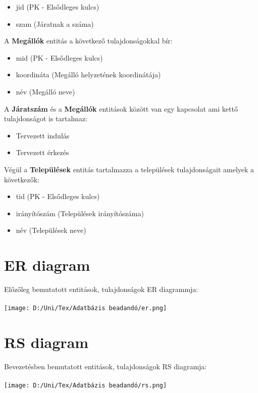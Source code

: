 \documentclass[12pt]{article}
\begin{document}
\begin{itemize}
\item jid (PK - Elsődleges kulcs)
\item szam (Járatnak a száma)
\end{itemize}
A \textbf{Megállók} entitás a következő tulajdonságokkal bír:
\begin{itemize}
\item mid (PK - Elsődleges kulcs)
\item koordináta (Megálló helyzetének koordinátája)
\item név (Megálló neve)
\end{itemize}
A \textbf{Járatszám} és a \textbf{Megállók} entitások között van egy kapcsolat ami kettő tulajdonságot is tartalmaz:
\begin{itemize}
\item Tervezett indulás
\item Tervezett érkezés
\end{itemize}
Végül a \textbf{Települések} entitás tartalmazza a települések tulajdonságait amelyek a következők:
\begin{itemize}
\item tid (PK - Elsődleges kulcs)
\item irányítószám (Települések irányítószáma)
\item név (Települések neve)
\end{itemize}
\newpage
\section{ER diagram}
Előzőleg bemutatott entitások, tulajdonságok ER diagrammja:\\
\\
\texttt{[image: D:/Uni/Tex/Adatbázis beadandó/er.png]}
\newpage
\section{RS diagram}
Bevezetésben bemutatott entitások, tulajdonságok RS diagramja:\\
\\
\texttt{[image: D:/Uni/Tex/Adatbázis beadandó/rs.png]}
\end{document}
